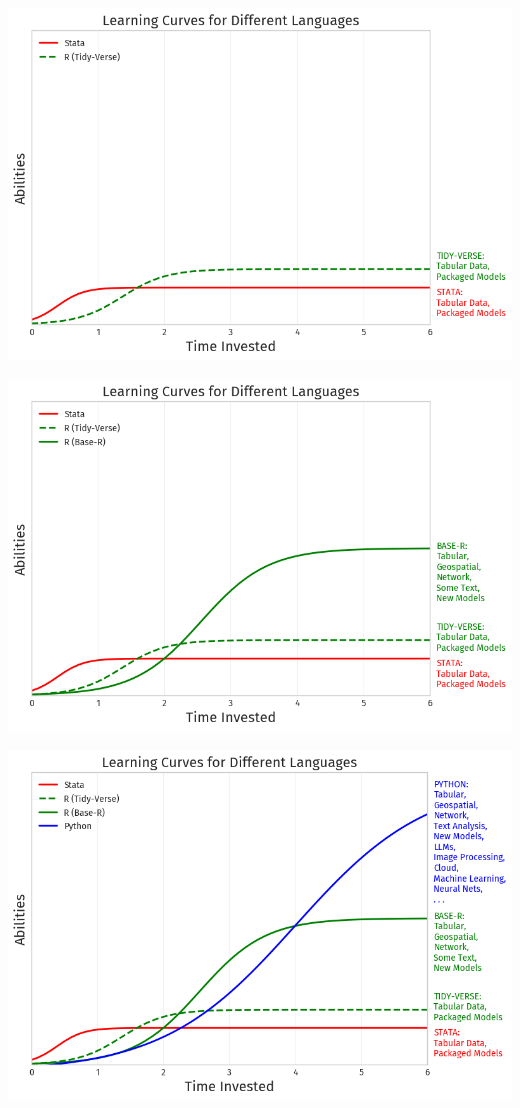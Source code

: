\documentclass[11pt]{beamer}
\begin{document}
\begin{frame}[c]{}
	\centering
	\includegraphics[width=\textwidth ]{language_2.png}
\end{frame}

\begin{frame}[c]{}
	\centering
	\includegraphics[width=\textwidth ]{language_3.png}
\end{frame}

\begin{frame}[c]{}
	\centering
	\includegraphics[width=\textwidth ]{language_4.png}
\end{frame}
\end{document}
